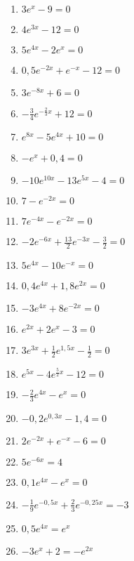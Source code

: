 \newpage
\begin{Exercise}[title={Löse folgende Gleichungen}, label=eFktGlA1]\\
	\begin{minipage}{\textwidth}
		\begin{minipage}{0.49\textwidth}
			\begin{enumerate}[label=\alph*)]
				\item \(3e^x-9=0\)
				\item \(4e^{3x}-12=0\)
				\item \(5e^{4x}-2e^{x}=0\)
				\item \(0,5e^{-2x}+e^{-x}-12=0\)
				\item \(3e^{-8x}+6=0\)
				\item \(-\frac{3}{4}e^{-\tfrac{2}{3}x}+12=0\)
				\item \(e^{8x}-5e^{4x}+10=0\)
				\item \(-e^{x}+0,4=0\)
				\item \(-10e^{10x}-13e^{5x}-4=0\)
				\item \(7-e^{-2x}=0\)
				\item \(7e^{-4x}-e^{-2x}=0\)
				\item \(-2e^{-6x}+\frac{13}{2}e^{-3x}-\frac{3}{2}=0\)
				\item \(5e^{4x}-10e^{-x}=0\)
			\end{enumerate}
		\end{minipage}
		\begin{minipage}{0.49\textwidth}
			\begin{enumerate}[label=\alph*)]
				\setcounter{enumi}{13}
				\item \(0,4e^{4x}+1,8e^{2x}=0\)
				\item \(-3e^{4x}+8e^{-2x}=0\)
				\item \(e^{2x}+2e^{x}-3=0\)
				\item \(3e^{3x}+\frac{1}{2}e^{1,5x}-\frac{1}{2}=0\)
				\item \(e^{5x}-4e^{\tfrac{5}{2}x}-12=0\)
				\item \(-\frac{2}{3}e^{4x}-e^{x}=0\)
				\item \(-0,2e^{0,3x}-1,4=0\)
				\item \(2e^{-2x}+e^{-x}-6=0\)
				\item \(5e^{-6x}=4\)
				\item \(0,1e^{4x}-e^{x}=0\)
				\item \(-\frac{1}{9}e^{-0,5x}+\frac{2}{3}e^{-0,25x}=-3\)
				\item \(0,5e^{4x}=e^{x}\)
				\item \(-3e^{x}+2=-e^{2x}\)
			\end{enumerate}
		\end{minipage}
	\end{minipage}
\end{Exercise}
